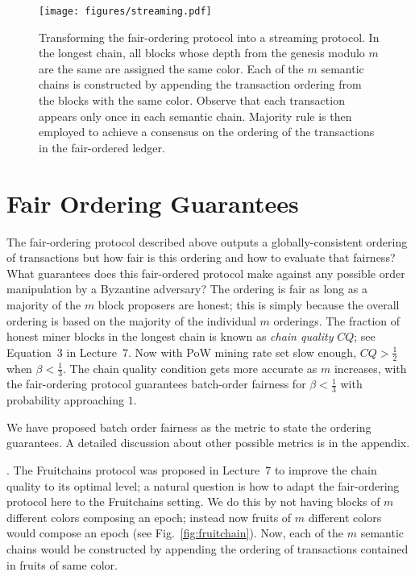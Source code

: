 \documentclass{article}
\begin{document}
\begin{figure}
    \centering
    \texttt{[image: figures/streaming.pdf]}
    \caption{Transforming the fair-ordering protocol into a streaming protocol. In the longest chain, all blocks whose depth from the genesis modulo $m$ are the same are assigned the same color. Each of the $m$ semantic chains is constructed by appending the transaction ordering from the blocks with the same color. Observe that each transaction appears only once in each semantic chain. Majority rule is then employed to achieve a consensus on the ordering of the transactions in the fair-ordered ledger.}
    \label{fig:streaming}
\end{figure}


\section*{Fair Ordering Guarantees}
The fair-ordering protocol described above outputs a globally-consistent ordering of transactions but how fair is this ordering and how to evaluate that fairness? What guarantees does this fair-ordered protocol make against any possible order manipulation by a Byzantine adversary? 
The ordering is fair as long as a majority of the $m$ block proposers are honest; this is simply because the overall ordering is based on the majority of the individual $m$ orderings. The fraction of honest miner blocks in the longest chain is known as {\em chain quality} $CQ$; see Equation~3 in Lecture~7. Now with PoW mining rate set slow enough, $CQ > \frac{1}{2}$ when $\beta < \frac{1}{3}$.  The chain quality condition gets more accurate as $m$ increases, with the  fair-ordering protocol guarantees batch-order fairness for $\beta < \frac{1}{3}$ with probability approaching $1$.

We have proposed batch order fairness as the metric to state the ordering guarantees. A detailed discussion about other possible metrics is in the appendix. 


. The {\sf Fruitchains} protocol was proposed in Lecture~7 to improve the chain quality to its optimal level;  a natural question is how to adapt the fair-ordering protocol here to the {\sf Fruitchains} setting. We do this by not having blocks of $m$ different colors composing an epoch; instead now fruits of $m$ different colors would compose an epoch (see Fig.~\ref{fig:fruitchain}).  Now, each of the $m$ semantic chains would be constructed by appending the ordering of transactions contained in fruits of same color.
\end{document}
